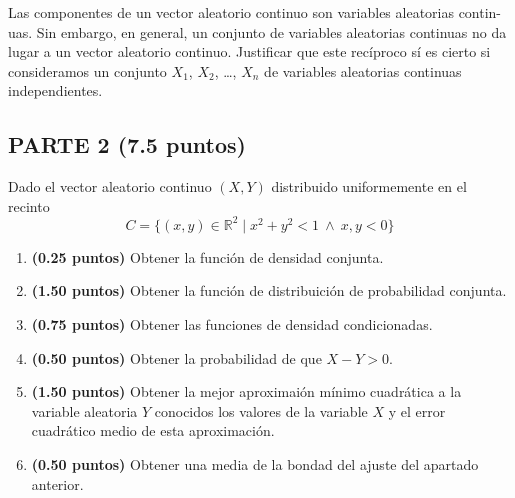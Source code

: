 \documentclass[12pt]{article}
\begin{document}
    \begin{ejercicio}[0.75 puntos]
        Las componentes de un vector aleatorio continuo son variables aleatorias contin- uas. Sin embargo, en general, un conjunto de variables aleatorias continuas no da lugar a un vector aleatorio continuo. Justificar que este recíproco sí es cierto si consideramos un conjunto $X_1$, $X_2$, \ldots, $X_n$ de variables aleatorias continuas independientes.
    \end{ejercicio}

    \subsection*{PARTE 2 (7.5 puntos)}
    \setcounter{ejercicio}{0}
    \begin{ejercicio}[5 puntos]
        Dado el vector aleatorio continuo $(X,Y)$ distribuido uniformemente en el recinto
        \begin{equation*}
            C = \{(x,y)\in \mathbb{R}^2 \mid x^2+y^2 < 1 \ \land\ x,y < 0\}
        \end{equation*}
        \begin{enumerate}[label=\alph*)]
            \item \textbf{(0.25 puntos)} Obtener la función de densidad conjunta.
            \item \textbf{(1.50 puntos)} Obtener la función de distribuición de probabilidad conjunta.
            \item \textbf{(0.75 puntos)} Obtener las funciones de densidad condicionadas.
            \item \textbf{(0.50 puntos)} Obtener la probabilidad de que $X-Y>0$.
            \item \textbf{(1.50 puntos)} Obtener la mejor aproximaión mínimo cuadrática a la variable aleatoria $Y$ conocidos los valores de la variable $X$ y el error cuadrático medio de esta aproximación.
            \item \textbf{(0.50 puntos)} Obtener una media de la bondad del ajuste del apartado anterior.
        \end{enumerate}
    \end{ejercicio}
\end{document}
